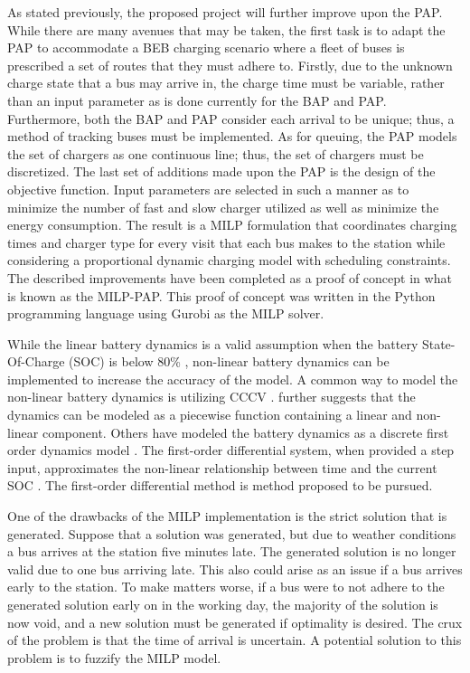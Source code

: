 \documentclass[ee,msthesis]{usuthesis}
\begin{document}
As stated previously, the proposed project will further improve upon the PAP. While there are many avenues that may be
taken, the first task is to adapt the PAP to accommodate a BEB charging scenario where a fleet of buses is prescribed a
set of routes that they must adhere to. Firstly, due to the unknown charge state that a bus may arrive in, the charge
time must be variable, rather than an input parameter as is done currently for the BAP and PAP. Furthermore, both the
BAP and PAP consider each arrival to be unique; thus, a method of tracking buses must be implemented. As for queuing,
the PAP models the set of chargers as one continuous line; thus, the set of chargers must be discretized. The last set
of additions made upon the PAP is the design of the objective function. Input parameters are selected in such a manner
as to minimize the number of fast and slow charger utilized as well as minimize the energy consumption. The result is a
MILP formulation that coordinates charging times and charger type for every visit that each bus makes to the station
while considering a proportional dynamic charging model with scheduling constraints. The described improvements have
been completed as a proof of concept in what is known as the MILP-PAP. This proof of concept was written in the Python
programming language using Gurobi as the MILP solver.

While the linear battery dynamics is a valid assumption when the battery State-Of-Charge (SOC) is below 80\%
\cite{liu-2020-batter-elect}, non-linear battery dynamics can be implemented to increase the accuracy of the model. A
common way to model the non-linear battery dynamics is utilizing CCCV \cite{abdollahi-2016-optim-batter,chen-2008-desig-grey}. \cite{zhang-2021-optim-elect} further suggests that the dynamics can be modeled as a piecewise
function containing a linear and non-linear component. Others have modeled the battery dynamics as a discrete first
order dynamics model \cite{whitaker-2022-a-network}. The first-order differential system, when provided a step input,
approximates the non-linear relationship between time and the current SOC \cite{whitaker-2022-a-network}. The
first-order differential method is method proposed to be pursued.

One of the drawbacks of the MILP implementation is the strict solution that is generated. Suppose that a solution was
generated, but due to weather conditions a bus arrives at the station five minutes late. The generated solution is no
longer valid due to one bus arriving late. This also could arise as an issue if a bus arrives early to the station. To
make matters worse, if a bus were to not adhere to the generated solution early on in the working day, the majority of
the solution is now void, and a new solution must be generated if optimality is desired. The crux of the problem is that
the time of arrival is uncertain. A potential solution to this problem is to fuzzify the MILP model.
\end{document}
